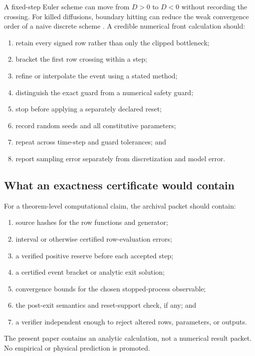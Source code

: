 \documentclass[11pt]{article}
\theoremstyle{definition}
\theoremstyle{remark}
\begin{document}
A fixed-step Euler scheme can move from \(D>0\) to \(D<0\) without
recording the crossing.  For killed diffusions, boundary hitting can reduce
the weak convergence order of a naive discrete scheme
\cite{Gobet2000}.  A credible numerical front calculation should:
\begin{enumerate}[leftmargin=2em]
\item retain every signed row rather than only the clipped bottleneck;
\item bracket the first row crossing within a step;
\item refine or interpolate the event using a stated method;
\item distinguish the exact guard from a numerical safety guard;
\item stop before applying a separately declared reset;
\item record random seeds and all constitutive parameters;
\item repeat across time-step and guard tolerances; and
\item report sampling error separately from discretization and model error.
\end{enumerate}

\subsection{What an exactness certificate would contain}

For a theorem-level computational claim, the archival packet should contain:
\begin{enumerate}[leftmargin=2em]
\item source hashes for the row functions and generator;
\item interval or otherwise certified row-evaluation errors;
\item a verified positive reserve before each accepted step;
\item a certified event bracket or analytic exit solution;
\item convergence bounds for the chosen stopped-process observable;
\item the post-exit semantics and reset-support check, if any; and
\item a verifier independent enough to reject altered rows, parameters,
      or outputs.
\end{enumerate}

The present paper contains an analytic calculation, not a numerical
result packet.  No empirical or physical prediction is promoted.
\end{document}
